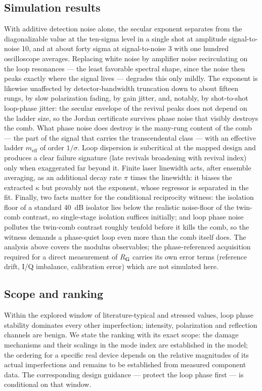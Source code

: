 \documentclass[11pt,a4paper]{article}
\begin{document}
\subsection{Simulation results}

With additive detection noise alone, the secular exponent separates from the
diagonalizable value at the ten-sigma level in a single shot at amplitude
signal-to-noise 10, and at about forty sigma at signal-to-noise 3 with one
hundred oscilloscope averages. Replacing white noise by amplifier noise
recirculating on the loop resonances --- the least favorable spectral shape,
since the noise then peaks exactly where the signal lives --- degrades this
only mildly. The exponent is likewise unaffected by detector-bandwidth
truncation down to about fifteen rungs, by slow polarization fading, by gain
jitter, and, notably, by shot-to-shot loop-phase jitter: the secular envelope
of the revival peaks does not depend on the ladder size, so the Jordan
certificate survives phase noise that visibly destroys the comb. What phase
noise does destroy is the many-rung content of the comb --- the part of the
signal that carries the transcendental class --- with an effective ladder
$m_{\mathrm{eff}}$ of order $1/\sigma$. Loop dispersion is subcritical at the
mapped design and produces a clear failure signature (late revivals broadening
with revival index) only when exaggerated far beyond it. Finite laser linewidth
acts, after ensemble averaging, as an additional decay rate $\pi$ times the
linewidth: it biases the extracted $\kappa$ but provably not the exponent,
whose regressor is separated in the fit. Finally, two facts matter for the
conditional reciprocity witness: the isolation floor of a standard 40~dB
isolator lies below the realistic noise-floor of the twin-comb contrast, so
single-stage isolation suffices initially; and loop phase noise pollutes the
twin-comb contrast roughly tenfold before it kills the comb, so the witness
demands a phase-quiet loop even more than the comb itself does. The
analysis above covers the modulus observables; the phase-referenced
acquisition required for a direct measurement of $R_{\mathbf{G}}$ carries
its own error terms (reference drift, I/Q imbalance, calibration error)
which are not simulated here.

\subsection{Scope and ranking}

Within the explored window of literature-typical and stressed values, loop
phase stability dominates every other imperfection; intensity, polarization and
reflection channels are benign. We state the ranking with its exact scope: the
damage mechanisms and their scalings in the mode index are established in the
model; the ordering for a specific real device depends on the relative
magnitudes of its actual imperfections and remains to be established from
measured component data. The corresponding design guidance --- protect the loop
phase first --- is conditional on that window.
\end{document}

